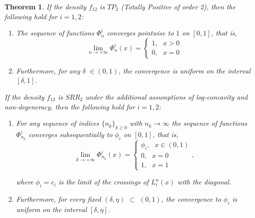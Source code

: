 \documentclass[onecolumn]{article}
\newtheorem{theorem}{Theorem}
\begin{document}
\begin{theorem}
\label{phi-conv} If the density $f_{12}$ is $TP_{2}$ (Totally Positive of
order 2), then the following hold for $i=1,2$:

\begin{enumerate}
\item The sequence of functions $\Phi _{n}^{i}$ converges pointwise to $1$
on $[0,1]$, that is, 
\begin{equation}
\lim_{n\rightarrow +\infty }\Phi _{n}^{i}(x)=\left\{ 
\begin{array}{c}
1,\text{ }x>0 \\ 
0,\text{ }x=0%
\end{array}%
\right.  \label{400}
\end{equation}

\item Furthermore, for any $\delta $ $\in (0,1)$, the convergence is uniform
on the interval $[\delta ,1].$
\end{enumerate}

If the density $f_{12}$ is $SRR_{2}$ under the additional assumptions of
log-concavity and non-degeneracy, then the following hold for $i=1,2$:

\begin{enumerate}
\item For any sequence of indices $\{n_{k}\}_{k\geq 0}$ with $%
n_{k}\rightarrow \infty $ the sequence of functions $\Phi _{n_{k}}^{i}$
converges subsequentially to $\phi _{i}$ on $[0,1]$, that is, 
\begin{equation}
\lim_{k\rightarrow +\infty }\Phi _{n_{k}}^{i}(x)=\left\{ 
\begin{array}{c}
\phi _{i},\text{ }x\in (0,1) \\ 
0,\text{ }x=0 \\ 
1,\text{ }x=1%
\end{array}%
\right. ,  \label{401}
\end{equation}

where $\phi _{i}=c_{i}$ is the limit of the crossings of $L_{i}^{n}(x)$ with
the diagonal.

\item Furthermore, for every fixed $(\delta ,\eta )$ $\subset $ $(0,1)$, the
convergence to $\phi _{i}$ is uniform on the interval $[\delta ,\eta ]$.
\end{enumerate}
\end{theorem}
\end{document}
